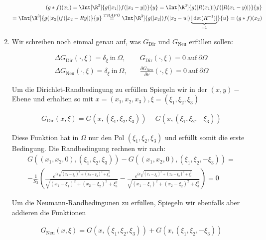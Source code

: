 \begin{solution}
\begin{enumerate}[label = (\roman*)]
\begin{align*}
  (g \ast f)(x_1)
  =
  \Int[\R^3]{g(|x_1|) f(|x_1 - y|)}{y}
  = \Int[\R^3]{g(|R(x_1)|) f(|R(x_1 - y)|)}{y} \\
  =
  \Int[\R^3]{g(|x_2|) f(|x_2 - Ry|) }{y}
  \stackrel{TRAFO}{=} \Int[\R^3]{g(|x_2|) f(|x_2 - u|) \underbrace{|\det(R^{-1})|}_{=1}}{u} =
  (g \ast f)(x_2)
\end{align*}

\item Wir schreiben noch einmal genau auf, was $G_{\mathrm{Dir}}$ und $G_{\mathrm{Neu}}$ erfüllen sollen:

\begin{align*}
  \Delta G_\mathrm{Dir}(\cdot, \xi) = \delta_\xi ~\text{in}~ \Omega,&
  \quad
  G_\mathrm{Dir}(\cdot, \xi) = 0 ~\text{auf}~ \partial \Omega \\
  \Delta G_\mathrm{Neu}(\cdot, \xi) = \delta_\xi ~\text{in}~ \Omega,&
  \quad
  \frac{\partial G_\mathrm{Neu}}{\partial \nu}(\cdot, \xi) = 0 ~\text{auf}~ \partial \Omega
\end{align*}

Um die Dirichlet-Randbedingung zu erfüllen Spiegeln wir in der $(x,y)-$Ebene und erhalten so mit $x = (x_1,x_2,x_3), \xi = (\xi_1, \xi_2, \xi_3)$

\begin{align*}
  G_\mathrm{Dir}(x,\xi) = G(x,(\xi_1, \xi_2, \xi_3)) - G(x,(\xi_1,\xi_2, -\xi_3))
\end{align*}

Diese Funktion hat in $\Omega$ nur den Pol $(\xi_1, \xi_2, \xi_3)$ und erfüllt somit die erste Bedingung. Die Randbedingung rechnen wir nach:
\begin{align*}
  G((x_1,x_2,0),(\xi_1, \xi_2, \xi_3)) - G((x_1,x_2,0),(\xi_1,\xi_2, -\xi_3))
  = \\
  -\frac{1}{S_3}\left(\frac{e^{ik\sqrt{(x_1 - \xi_1)^2 + (x_2 - \xi_2)^2 + \xi_3^2 }}}{\sqrt{(x_1 - \xi_1)^2 + (x_2 - \xi_2)^2 + \xi_3^2 }}
    -\frac{e^{ik\sqrt{(x_1 - \xi_1)^2 + (x_2 - \xi_2)^2 + \xi_3^2 }}}{\sqrt{(x_1 - \xi_1)^2 + (x_2 - \xi_2)^2 + \xi_3^2 }}\right)
  =
  0
\end{align*}

Um die Neumann-Randbedingunen zu erfüllen, Spiegeln wir ebenfalls aber addieren die Funktionen

\begin{align*}
  G_\mathrm{Neu}(x,\xi) = G(x,(\xi_1, \xi_2, \xi_3)) + G(x,(\xi_1,\xi_2, -\xi_3))
\end{align*}


\end{enumerate}
\end{solution}
